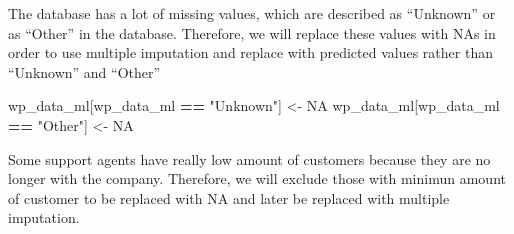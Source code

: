 \documentclass[]{article}
\newenvironment{Shaded}{\begin{snugshade}}{\end{snugshade}}
\newcommand{\KeywordTok}[1]{\textcolor[rgb]{0.13,0.29,0.53}{\textbf{#1}}}
\newcommand{\DecValTok}[1]{\textcolor[rgb]{0.00,0.00,0.81}{#1}}
\newcommand{\StringTok}[1]{\textcolor[rgb]{0.31,0.60,0.02}{#1}}
\newcommand{\OtherTok}[1]{\textcolor[rgb]{0.56,0.35,0.01}{#1}}
\newcommand{\OperatorTok}[1]{\textcolor[rgb]{0.81,0.36,0.00}{\textbf{#1}}}
\newcommand{\NormalTok}[1]{#1}
\begin{document}
\begin{Shaded}
\end{Shaded}

The database has a lot of missing values, which are described as
``Unknown'' or as ``Other'' in the database. Therefore, we will replace
these values with NAs in order to use multiple imputation and replace
with predicted values rather than ``Unknown'' and ``Other''

\begin{Shaded}
\begin{Highlighting}[]
\NormalTok{wp_data_ml[wp_data_ml }\OperatorTok{==}\StringTok{ "Unknown"}\NormalTok{] <-}\StringTok{ }\OtherTok{NA}
\NormalTok{wp_data_ml[wp_data_ml }\OperatorTok{==}\StringTok{ "Other"}\NormalTok{] <-}\StringTok{ }\OtherTok{NA}
\end{Highlighting}
\end{Shaded}

Some support agents have really low amount of customers because they are
no longer with the company. Therefore, we will exclude those with
minimun amount of customer to be replaced with NA and later be replaced
with multiple imputation.

\begin{Shaded}
\end{Shaded}
\end{document}
